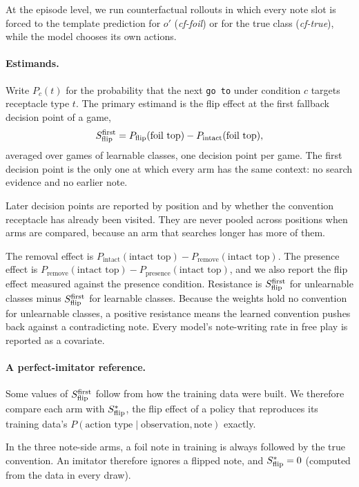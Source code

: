 At the episode level, we run counterfactual rollouts in which every note slot is forced to the template prediction for $o'$ (\emph{cf-foil}) or for the true class (\emph{cf-true}), while the model chooses its own actions.

\paragraph{Estimands.}
Write $P_c(t)$ for the probability that the next \texttt{go to} under condition $c$ targets receptacle type $t$. The primary estimand is the flip effect at the first fallback decision point of a game,
\[
S_{\mathrm{flip}}^{\mathrm{first}} = P_{\text{flip}}(\text{foil top}) - P_{\text{intact}}(\text{foil top}),
\]
averaged over games of learnable classes, one decision point per game. The first decision point is the only one at which every arm has the same context: no search evidence and no earlier note.

Later decision points are reported by position and by whether the convention receptacle has already been visited. They are never pooled across positions when arms are compared, because an arm that searches longer has more of them.

The removal effect is $P_{\text{intact}}(\text{intact top}) - P_{\text{remove}}(\text{intact top})$. The presence effect is $P_{\text{remove}}(\text{intact top}) - P_{\text{presence}}(\text{intact top})$, and we also report the flip effect measured against the presence condition. Resistance is $S_{\mathrm{flip}}^{\mathrm{first}}$ for unlearnable classes minus $S_{\mathrm{flip}}^{\mathrm{first}}$ for learnable classes. Because the weights hold no convention for unlearnable classes, a positive resistance means the learned convention pushes back against a contradicting note. Every model's note-writing rate in free play is reported as a covariate.

\paragraph{A perfect-imitator reference.}
Some values of $S_{\mathrm{flip}}^{\mathrm{first}}$ follow from how the training data were built. We therefore compare each arm with $S_{\mathrm{flip}}^{*}$, the flip effect of a policy that reproduces its training data's $P(\text{action type}\mid\text{observation},\text{note})$ exactly.

In the three note-side arms, a foil note in training is always followed by the true convention. An imitator therefore ignores a flipped note, and $S_{\mathrm{flip}}^{*} = 0$ (computed from the data in every draw).

